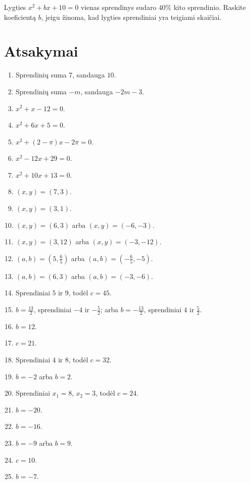 \documentclass[11pt,a4paper]{scrartcl}
\begin{document}
\begin{problem}
Lygties $x^2 + bx + 10 = 0$ vienas sprendinys sudaro $40\%$ kito sprendinio. Raskite koeficientą $b$, jeigu žinoma, kad lygties sprendiniai yra teigiami skaičiai.
\end{problem}

\newpage
\section{Atsakymai}

\begin{enumerate}[label=\textbf{\arabic*.}, leftmargin=*]
    \item Sprendinių suma $7$, sandauga $10$.
    \item Sprendinių suma $-m$, sandauga $-2m-3$.
    \item $x^2+x-12=0$.
    \item $x^2+6x+5=0$.
    \item $x^2+(2-\pi)x-2\pi=0$.
    \item $x^2-12x+29=0$.
    \item $x^2+10x+13=0$.
    \item $(x,y)=(7,3)$.
    \item $(x,y)=(3,1)$.
    \item $(x,y)=(6,3)$ arba $(x,y)=(-6,-3)$.
    \item $(x,y)=(3,12)$ arba $(x,y)=(-3,-12)$.
    \item $(a,b)=\left(5,\frac{6}{5}\right)$ arba $(a,b)=\left(-\frac{6}{5},-5\right)$.
    \item $(a,b)=(6,3)$ arba $(a,b)=(-3,-6)$.
    \item Sprendiniai $5$ ir $9$, todėl $c=45$.
    \item $b=\frac{13}{2}$, sprendiniai $-4$ ir $-\frac52$; arba $b=-\frac{13}{2}$, sprendiniai $4$ ir $\frac52$.
    \item $b=12$.
    \item $c=21$.
    \item Sprendiniai $4$ ir $8$, todėl $c=32$.
    \item $b=-2$ arba $b=2$.
    \item Sprendiniai $x_1=8$, $x_2=3$, todėl $c=24$.
    \item $b=-20$.
    \item $b=-16$.
    \item $b=-9$ arba $b=9$.
    \item $c=10$.
    \item $b=-7$.
\end{enumerate}
\end{document}
